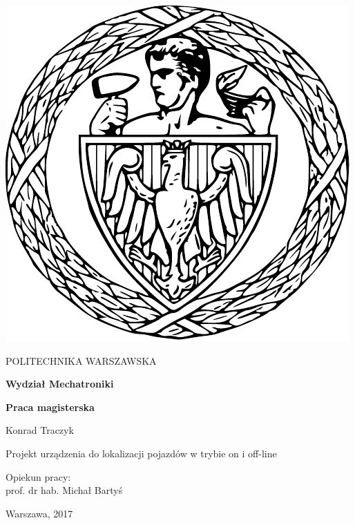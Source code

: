 

\thispagestyle {empty}

\begin{center}
	\includegraphics[scale=0.4]{img/pw}
	
	\vspace{0.5cm}
	
	{\fontsize{20}{20}\selectfont POLITECHNIKA WARSZAWSKA}
	
	\vspace{1.0cm}
	
	\textbf{{\fontsize{14}{14}\selectfont Wydział Mechatroniki}}
	
	\vspace{1.5cm}
	
	\textbf{{\fontsize{14}{14}\selectfont Praca magisterska}}

	\vspace{2.0cm}
	
	{\fontsize{14}{14}\selectfont Konrad Traczyk}
	
	\vspace{1cm}
	
	{\fontsize{28}{28}\selectfont Projekt urządzenia do lokalizacji pojazdów w trybie on i off-line}
	
	\vspace{1cm}
	\begin{flushright}
		{\fontsize{14}{14}\selectfont Opiekun pracy: \\ 
		prof. dr hab. Michał Bartyś}
	
		\vspace{1cm}
		

		
	\end{flushright}
	
	\vspace{1cm}
	
	{\fontsize{12}{12}\selectfont Warszawa, 2017}
	
	
\end{center}